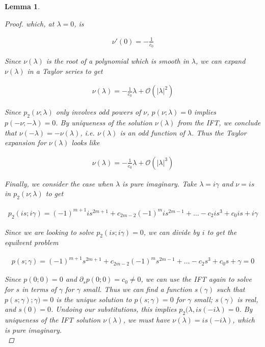 \documentclass[12pt]{article}
\newtheorem{lemma}{Lemma}
\begin{document}
\begin{lemma}
\begin{proof}
which, at $\lambda = 0$, is

\begin{align*}
\nu'(0) = -\frac{1}{c_0}
\end{align*}

Since $\nu(\lambda)$ is the root of a polynomial which is smooth in $\lambda$, we can expand $\nu(\lambda)$ in a Taylor series to get

\begin{align*}
\nu(\lambda) = -\frac{1}{c_0} \lambda + \mathcal{O}(|\lambda|^2)
\end{align*}

Since $p_2(\nu; \lambda)$ only involves odd powers of $\nu$, $p(\nu; \lambda) = 0$ implies $p(-\nu; -\lambda) = 0$. By uniqueness of the solution $\nu(\lambda)$ from the IFT, we conclude that $\nu(-\lambda) = -\nu(\lambda)$, i.e. $\nu(\lambda)$ is an odd function of $\lambda$. Thus the Taylor expansion for $\nu(\lambda)$ looks like

\begin{align*}
\nu(\lambda) = -\frac{1}{c_0} \lambda + \mathcal{O}(|\lambda|^3)
\end{align*}

Finally, we consider the case when $\lambda$ is pure imaginary. Take $\lambda = i \gamma$ and $\nu = i s$ in $p_2(\nu; \lambda)$ to get

\begin{align*}
p_2(i s; i \gamma) = (-1)^{m+1} i s^{2m+1} + c_{2m-2} (-1)^m i s^{2m-1} + \dots - c_2 i s^3 + c_0 i s + i \gamma
\end{align*}

Since we are looking to solve $p_2(i s; i \gamma) = 0$, we can divide by $i$ to get the equilvent problem

\begin{align*}
p(s; \gamma) = (-1)^{m+1} s^{2m+1} + c_{2m-2} (-1)^m s^{2m-1} + \dots - c_2 s^3 + c_0 s +  \gamma = 0
\end{align*}

Since $p(0; 0) = 0$ and $\partial_s p(0; 0) = c_0 \neq 0$, we can use the IFT again to solve for $s$ in terms of $\gamma$ for $\gamma$ small. Thus we can find a function $s(\gamma)$ such that $p(s; \gamma); \gamma) = 0$ is the unique solution to $p(s; \gamma) = 0$ for $\gamma$ small; $s(\gamma)$ is real, and $s(0) = 0$. Undoing our substitutions, this implies $p_2(\lambda, i s(-i \lambda) = 0$. By uniqueness of the IFT solution $\nu(\lambda)$, we must have $\nu(\lambda) = i s(-i \lambda)$, which is pure imaginary.\\ 
\end{proof}
\end{lemma}
\end{document}
